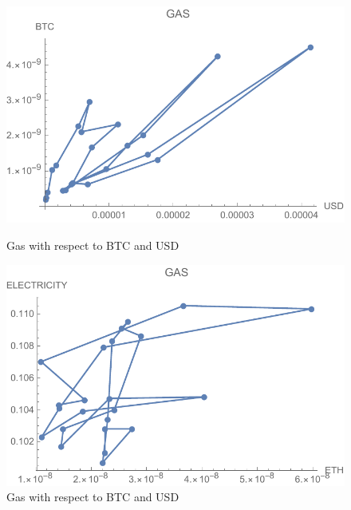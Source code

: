 \begin{figure}[!htb]
	\includegraphics[width=\linewidth]{figures/gas.pdf}
	\caption{Gas with respect to BTC and USD}\label{fig:gas}
	\endminipage\hfill
	\includegraphics[width=\linewidth]{figures/gasElectricity.pdf}
	\caption{Gas with respect to BTC and USD}\label{fig:gasElectricity}
	\endminipage\hfill
\end{figure}

